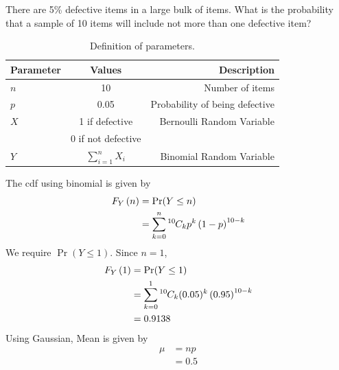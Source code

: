\documentclass[]{article}
\begin{document}
\providecommand{\qfunc}[1]{\ensuremath{Q\left(#1\right)}}
\providecommand{\gauss}[2]{\mathcal{N}\ensuremath{\left(#1,#2\right)}}
\providecommand{\diff}[2]{\ensuremath{\frac{d{#1}}{d{#2}}}}
\providecommand{\myceil}[1]{\left \lceil #1 \right \rceil }
\newcommand\figref{Fig.~\ref}
\newcommand\tabref{Table~\ref}
\newcommand{\sinc}{\,\text{sinc}\,}
\newcommand{\rect}{\,\text{rect}\,}

\let\vec\mathbf

There are 5\% defective items in a large bulk of items. What is the probability 
that a sample of 10 items will include not more than one defective item?
\solution
\begin{table}[!ht]
\centering
\begin{tabular}{|l|c|r|}
    \hline
    Parameter & Values & Description\\
    \hline
    $n$ & 10 & Number of items\\
    \hline
    $p$ & 0.05 & Probability of being defective\\
    \hline
    $X$ & 1 if defective & Bernoulli Random Variable\\
    {} & 0 if not defective & {}\\
    \hline
    $Y$ & $\sum_{i=1}^nX_i$ & Binomial Random Variable\\
    \hline
\end{tabular}
\caption{Definition of parameters.}
\label{tab:gaussian/9/3/7}
\end{table}
The cdf using binomial is given by  
\begin{align}
	F_Y\left(n\right) &= \Pr(Y \leq n) \\
        &= \sum_{k=0}^n{{}^{10}\mkern-1muC_{k}}p^k\left(1-p\right)^{10-k}
\end{align}
We require $\Pr(Y \leq 1)$. Since $n = 1$,
\begin{align}
	F_Y\left(1\right) &= \Pr(Y \leq 1) \\
        &=  \sum_{k=0}^1{{}^{10}\mkern-1muC_{k}}(0.05)^k\left(0.95\right)^{10-k} \\
	&= 0.9138 
	\label{eq:9371}
\end{align} 
Using Gaussian,
Mean is given by
\begin{align}
	\mu &= np \\
	&= 0.5
\end{align}
\end{document}
